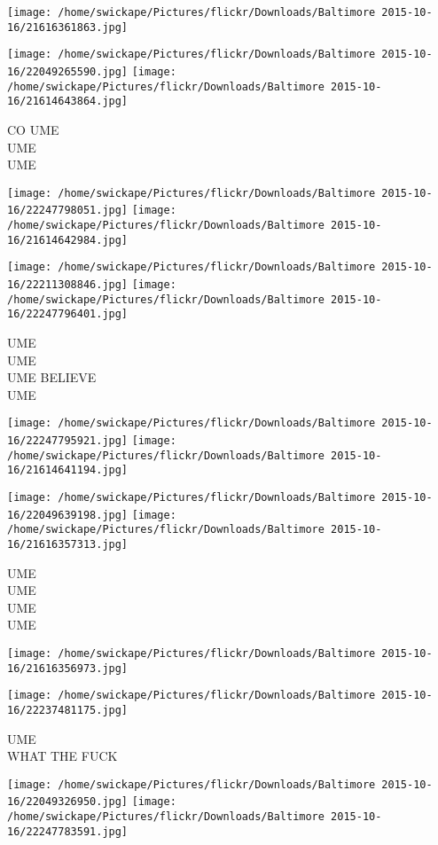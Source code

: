 \documentclass[10pt,letterpaper]{article}
\begin{document}
\texttt{[image: /home/swickape/Pictures/flickr/Downloads/Baltimore 2015-10-16/21616361863.jpg]}

\vspace{0.25in}
\texttt{[image: /home/swickape/Pictures/flickr/Downloads/Baltimore 2015-10-16/22049265590.jpg]}
\texttt{[image: /home/swickape/Pictures/flickr/Downloads/Baltimore 2015-10-16/21614643864.jpg]}

CO UME\\
UME\\
UME
\pagebreak

\texttt{[image: /home/swickape/Pictures/flickr/Downloads/Baltimore 2015-10-16/22247798051.jpg]}
\texttt{[image: /home/swickape/Pictures/flickr/Downloads/Baltimore 2015-10-16/21614642984.jpg]}

\texttt{[image: /home/swickape/Pictures/flickr/Downloads/Baltimore 2015-10-16/22211308846.jpg]}
\texttt{[image: /home/swickape/Pictures/flickr/Downloads/Baltimore 2015-10-16/22247796401.jpg]}

UME\\
UME\\
UME BELIEVE\\
UME
\pagebreak

\texttt{[image: /home/swickape/Pictures/flickr/Downloads/Baltimore 2015-10-16/22247795921.jpg]}
\texttt{[image: /home/swickape/Pictures/flickr/Downloads/Baltimore 2015-10-16/21614641194.jpg]}

\texttt{[image: /home/swickape/Pictures/flickr/Downloads/Baltimore 2015-10-16/22049639198.jpg]}
\texttt{[image: /home/swickape/Pictures/flickr/Downloads/Baltimore 2015-10-16/21616357313.jpg]}

UME\\
UME\\
UME\\
UME
\pagebreak

\texttt{[image: /home/swickape/Pictures/flickr/Downloads/Baltimore 2015-10-16/21616356973.jpg]}

\vspace{0.25in}
\texttt{[image: /home/swickape/Pictures/flickr/Downloads/Baltimore 2015-10-16/22237481175.jpg]}

UME\\
WHAT THE FUCK
\pagebreak

\texttt{[image: /home/swickape/Pictures/flickr/Downloads/Baltimore 2015-10-16/22049326950.jpg]}
\texttt{[image: /home/swickape/Pictures/flickr/Downloads/Baltimore 2015-10-16/22247783591.jpg]}
\end{document}
